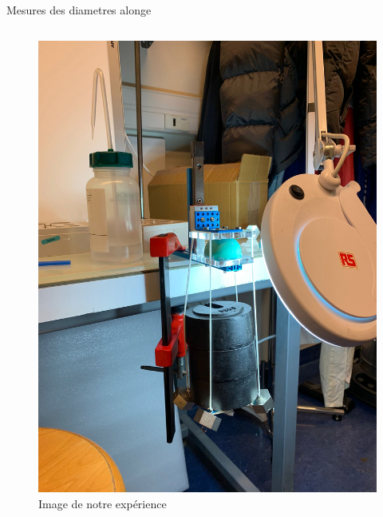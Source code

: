 \documentclass[aspectratio=169,xcolor=dvipsnames]{beamer}
\begin{document}
\begin{frame}{Mesures des diametres alonge}
\begin{columns}
\begin{figure}
            \includegraphics[height=0.65\textheight]{IMG-20221205-WA0028.jpg}
            \caption{Image de notre expérience}
            \label{fig:my_label}
        \end{figure}
        \end{columns}
\end{frame}

\end{document}
